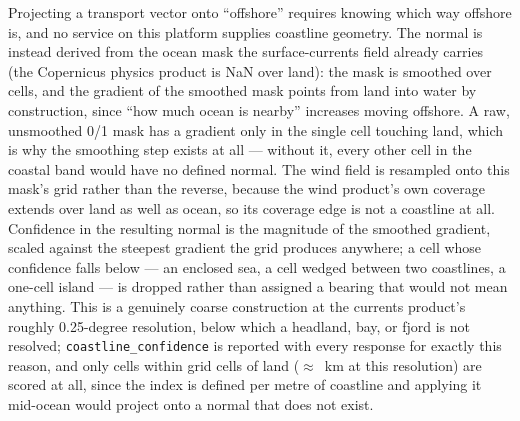  Projecting a
transport vector onto ``offshore'' requires knowing which way offshore is,
and no service on this platform supplies coastline geometry. The normal is
instead derived from the ocean mask the surface-currents field already
carries (the Copernicus physics product is NaN over land): the mask is
smoothed over \NormalSmoothingCells{} cells, and the gradient of the
smoothed mask points from land into water by construction, since ``how much
ocean is nearby'' increases moving offshore. A raw, unsmoothed 0/1 mask has a
gradient only in the single cell touching land, which is why the smoothing
step exists at all --- without it, every other cell in the coastal band would
have no defined normal. The wind field is resampled onto this mask's grid
rather than the reverse, because the wind product's own coverage extends
over land as well as ocean, so its coverage edge is not a coastline at all.
Confidence in the resulting normal is the magnitude of the smoothed
gradient, scaled against the steepest gradient the grid produces anywhere;
a cell whose confidence falls below \MinCoastlineConfidence{} --- an
enclosed sea, a cell wedged between two coastlines, a one-cell island --- is
dropped rather than assigned a bearing that would not mean anything. This is
a genuinely coarse construction at the currents product's roughly
0.25-degree resolution, below which a headland, bay, or fjord is not
resolved; \texttt{coastline\_confidence} is reported with every response for
exactly this reason, and only cells within \CoastalBandCells{} grid cells of
land ($\approx$\CoastalBandKm{}~km at this resolution) are scored at all,
since the index is defined per metre of coastline and applying it mid-ocean
would project onto a normal that does not exist.

